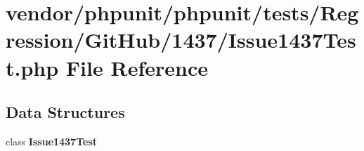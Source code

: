\section{vendor/phpunit/phpunit/tests/\+Regression/\+Git\+Hub/1437/\+Issue1437\+Test.php File Reference}
\label{_issue1437_test_8php}
\subsection*{Data Structures}
\begin{DoxyCompactItemize}
\item 
class {\bf Issue1437\+Test}
\end{DoxyCompactItemize}
